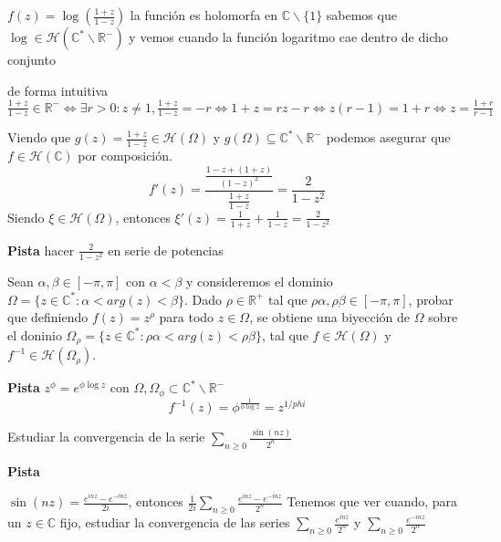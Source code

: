 \begin{sol}

$f(z) = \log(\frac{1+z}{1-z})$
la función es holomorfa en $\mathbb{C}\backslash \{1\}$
sabemos que $\log \in \mathcal{H}(\mathbb{C}^{\ast}\backslash\mathbb{R}^-)$
y vemos cuando la función logaritmo cae dentro de dicho conjunto

de forma intuitiva
$\frac{1+z}{1-z} \in\mathbb{R}^- \Longleftrightarrow \exists r>0 : z\not=1, \frac{1+z}{1-z} = -r \Longleftrightarrow 1+z = rz-r \Longleftrightarrow z(r-1)=1+r \Longleftrightarrow z = \frac{1+r}{r-1}$

Viendo que
$g(z) = \frac{1+z}{1-z} \in\mathcal{H}(\Omega)$ y $g(\Omega) \subseteq \mathbb{C}^{\ast}\backslash \mathbb{R}^-$
podemos asegurar que $f\in\mathcal{H}(\mathbb{C})$ por composición.
$$f'(z) = \frac{ \frac{1-z+(1+z)}{(1-z)^2} }{ \frac{1+z}{1-z} } = \frac{2}{1-z^2}$$
Siendo $\xi\in\mathcal{H}(\Omega)$, entonces
$\xi '(z) = \frac{1}{1+z} + \frac{1}{1-z} = \frac{2}{1-z^2}$



\textbf{Pista}
hacer $\frac{2}{1-z^2}$ en serie de potencias
\end{sol}





\begin{ejer}
	Sean $\alpha,\beta\in [-\pi,\pi]$ con $\alpha < \beta$ y consideremos el dominio $\Omega = \{ z\in\mathbb{C}^{\ast} : \alpha < arg(z) < \beta \}$. Dado $\rho\in\mathbb{R}^+$ tal que $\rho\alpha,\rho\beta\in[-\pi,\pi]$, probar que definiendo $f(z) = z^{\rho}$ para todo $z\in\Omega$, se obtiene una biyección de $\Omega$ sobre el doninio $\Omega_{\rho} = \{ z\in\mathbb{C}^{\ast} : \rho\alpha < arg(z) < \rho\beta \}$, tal que $f\in\mathcal{H}(\Omega)$ y $f^{-1}\in\mathcal{H}(\Omega_{\rho})$.
\end{ejer}
\textbf{Pista}
$z^{\phi} = e^{ \phi \log z}$ con $\Omega,\Omega_{\phi} \subset \mathbb{C}^{\ast}\backslash \mathbb{R^-}$
$$f^{-1}(z) = \phi^{\frac{1}{\phi\log z}} = z^{1/{phi}}$$


\begin{ejer}
	Estudiar la convergencia de la serie $\sum_{n\geq 0} \frac{\sin(nz)}{2^n}$
\end{ejer}
\textbf{Pista}

$\sin(nz) = \frac{e^{inz}-e^{-inz}}{2i}$, entonces
$\frac{1}{2i} \sum_{n\geq 0} \frac{e^{inz}-e^{-inz}}{2^n}$
Tenemos que ver cuando, para un $z\in\mathbb{C}$ fijo, estudiar la convergencia de las series
$\sum_{n\geq 0} \frac{e^{inz}}{2^n}$ y $\sum_{n\geq 0} \frac{e^{-inz}}{2^n}$

